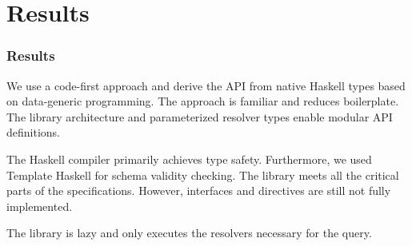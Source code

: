 \section{Results}

\begin{frame}\frametitle{Results}

\begin{itemize}
  
   We use a code-first approach and derive the API from native Haskell types based on data-generic programming. The approach is familiar and reduces boilerplate. The library architecture and parameterized resolver types enable modular API definitions.

   The Haskell compiler primarily achieves type safety. Furthermore, we used Template Haskell for schema validity checking. The library meets all the critical parts of the specifications. However, interfaces and directives are still not fully implemented. 

   The library is lazy and only executes the resolvers necessary for the query. 

\end{itemize}
\end{frame}

